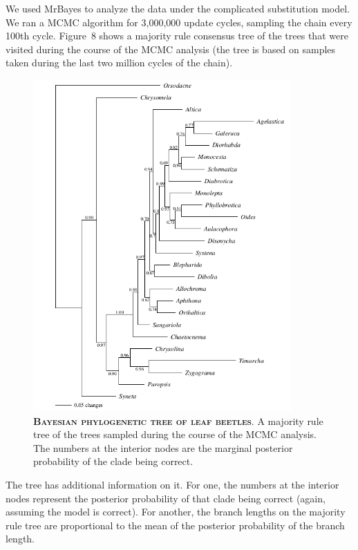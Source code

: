 \documentclass{svmult}
\begin{document}
We used MrBayes to analyze the data under the complicated substitution model. We ran a MCMC algorithm for 3,000,000 update cycles, sampling the
chain every 100th cycle. Figure~8 shows a majority rule consensus tree of the trees that were visited during the course of the MCMC analysis (the tree
is based on samples taken during the last two million cycles of the chain). 
\begin{figure}[t]
\centering
\includegraphics[height=5in]{fig8}
\caption{\textbf{\textsc{Bayesian phylogenetic tree of leaf beetles}}.
A majority rule tree of the trees sampled during the course of the MCMC analysis. The numbers at the interior nodes are the marginal posterior 
probability of the clade being correct.}
\label{fig8}
\end{figure}
The tree has additional information on it. For one, the numbers at the interior nodes represent the posterior probability of that clade being
correct (again, assuming the model is correct). For another, the branch lengths on the majority rule tree are proportional to the mean 
of the posterior probability of the branch length. 
\end{document}
